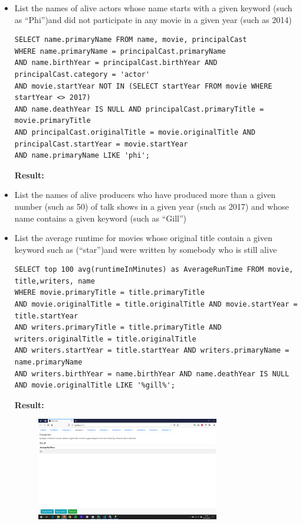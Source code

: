 \documentclass{sig-alternate}
\begin{document}
	\begin{itemize}
		\item List the names of alive actors whose name starts with a given keyword (such as “Phi”)and did not participate in any movie in a given year (such as 2014)\\
                \begin{lstlisting}
SELECT name.primaryName FROM name, movie, principalCast
WHERE name.primaryName = principalCast.primaryName
AND name.birthYear = principalCast.birthYear AND principalCast.category = 'actor'
AND movie.startYear NOT IN (SELECT startYear FROM movie WHERE startYear <> 2017)
AND name.deathYear IS NULL AND principalCast.primaryTitle = movie.primaryTitle
AND principalCast.originalTitle = movie.originalTitle AND principalCast.startYear = movie.startYear
AND name.primaryName LIKE 'phi';
                \end{lstlisting}
                \textbf{Result:}
		\item List the names of alive producers who have produced more than a given number (such as 50) of talk  shows in a  given  year  (such  as 2017) and  whose  name contains  a  given  keyword  (such  as “Gill”)
		\item List the average runtime for movies whose original title contain a given keyword such as (“star”)and were written by somebody who is still alive
                \begin{lstlisting}
SELECT top 100 avg(runtimeInMinutes) as AverageRunTime FROM movie, title,writers, name
WHERE movie.primaryTitle = title.primaryTitle
AND movie.originalTitle = title.originalTitle AND movie.startYear = title.startYear
AND writers.primaryTitle = title.primaryTitle AND writers.originalTitle = title.originalTitle
AND writers.startYear = title.startYear AND writers.primaryName = name.primaryName
AND writers.birthYear = name.birthYear AND name.deathYear IS NULL
AND movie.originalTitle LIKE '%gill%';
                \end{lstlisting}
                \textbf{Result:}
         	\begin{figure}[ht]
		    \includegraphics[width=8cm]{Screenshots/Scenario3.png}

\end{figure}
\end{itemize}
\end{document}
